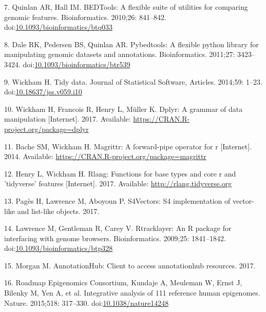 \documentclass[10pt,letterpaper]{article}
\begin{document}
\hypertarget{ref-Quinlan2010-gc}{}
7. Quinlan AR, Hall IM. BEDTools: A flexible suite of utilities for
comparing genomic features. Bioinformatics. 2010;26: 841--842.
doi:\href{https://doi.org/10.1093/bioinformatics/btq033}{10.1093/bioinformatics/btq033}

\hypertarget{ref-Dale2011-js}{}
8. Dale RK, Pedersen BS, Quinlan AR. Pybedtools: A flexible python
library for manipulating genomic datasets and annotations.
Bioinformatics. 2011;27: 3423--3424.
doi:\href{https://doi.org/10.1093/bioinformatics/btr539}{10.1093/bioinformatics/btr539}

\hypertarget{ref-Wickham2014-jc}{}
9. Wickham H. Tidy data. Journal of Statistical Software, Articles.
2014;59: 1--23.
doi:\href{https://doi.org/10.18637/jss.v059.i10}{10.18637/jss.v059.i10}

\hypertarget{ref-Wickham2017-dplyr}{}
10. Wickham H, Francois R, Henry L, Müller K. Dplyr: A grammar of data
manipulation {[}Internet{]}. 2017. Available:
\url{https://CRAN.R-project.org/package=dplyr}

\hypertarget{ref-R-magrittr}{}
11. Bache SM, Wickham H. Magrittr: A forward-pipe operator for r
{[}Internet{]}. 2014. Available:
\url{https://CRAN.R-project.org/package=magrittr}

\hypertarget{ref-R-rlang}{}
12. Henry L, Wickham H. Rlang: Functions for base types and core r and
'tidyverse' features {[}Internet{]}. 2017. Available:
\url{http://rlang.tidyverse.org}

\hypertarget{ref-R-S4vectors}{}
13. Pagès H, Lawrence M, Aboyoun P. S4Vectors: S4 implementation of
vector-like and list-like objects. 2017.

\hypertarget{ref-Lawrence2009-nt}{}
14. Lawrence M, Gentleman R, Carey V. Rtracklayer: An R package for
interfacing with genome browsers. Bioinformatics. 2009;25: 1841--1842.
doi:\href{https://doi.org/10.1093/bioinformatics/btp328}{10.1093/bioinformatics/btp328}

\hypertarget{ref-R-ahub}{}
15. Morgan M. AnnotationHub: Client to access annotationhub resources.
2017.

\hypertarget{ref-Roadmap_Epigenomics_Consortium2015-pr}{}
16. Roadmap Epigenomics Consortium, Kundaje A, Meuleman W, Ernst J,
Bilenky M, Yen A, et al. Integrative analysis of 111 reference human
epigenomes. Nature. 2015;518: 317--330.
doi:\href{https://doi.org/10.1038/nature14248}{10.1038/nature14248}

\nolinenumbers
\end{document}
